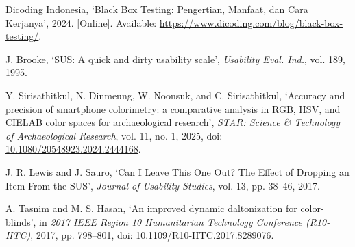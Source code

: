 {\begin{enumerate}[leftmargin=1.4em, itemsep=0.3em, label={[\arabic*]}]
  \item Dicoding Indonesia, `Black Box Testing: Pengertian, Manfaat, dan Cara Kerjanya', 2024. [Online]. Available: \url{https://www.dicoding.com/blog/black-box-testing/}.
  \item J. Brooke, `SUS: A quick and dirty usability scale', \textit{Usability Eval. Ind.}, vol. 189, 1995.
  \item Y. Sirisathitkul, N. Dinmeung, W. Noonsuk, and C. Sirisathitkul, `Accuracy and precision of smartphone colorimetry: a comparative analysis in RGB, HSV, and CIELAB color spaces for archaeological research', \textit{STAR: Science \& Technology of Archaeological Research}, vol. 11, no. 1, 2025, doi: \url{10.1080/20548923.2024.2444168}.
  \item J. R. Lewis and J. Sauro, `Can I Leave This One Out? The Effect of Dropping an Item From the SUS', \textit{Journal of Usability Studies}, vol. 13, pp. 38--46, 2017.
  \item A. Tasnim and M. S. Hasan, `An improved dynamic daltonization for color-blinds', in \textit{2017 IEEE Region 10 Humanitarian Technology Conference (R10-HTC)}, 2017, pp. 798--801, doi: 10.1109/R10-HTC.2017.8289076.
\end{enumerate}}